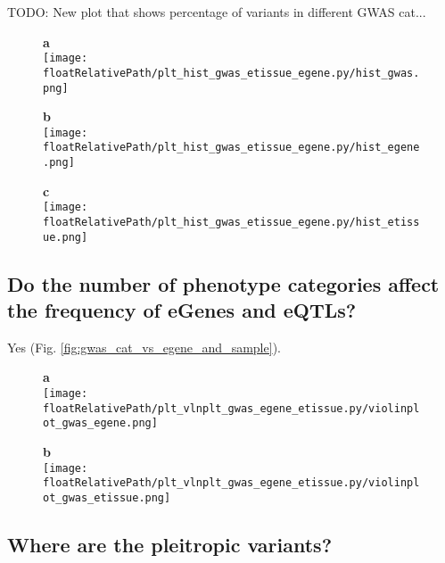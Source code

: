 TODO: New plot that shows percentage of variants in different GWAS cat...

\begin{figure*}[]
\centering
%
\begin{subfigure}[]{.32\textwidth}
\textbf{a}
\\
\texttt{[image: \\floatRelativePath/plt\_hist\_gwas\_etissue\_egene.py/hist\_gwas.png]}
\end{subfigure}
%
\begin{subfigure}[]{.32\textwidth}
\textbf{b}
\\
\texttt{[image: \\floatRelativePath/plt\_hist\_gwas\_etissue\_egene.py/hist\_egene.png]}
\end{subfigure}
%
\begin{subfigure}[]{.32\textwidth}
\textbf{c}
\\
\texttt{[image: \\floatRelativePath/plt\_hist\_gwas\_etissue\_egene.py/hist\_etissue.png]}
\end{subfigure}
%
\caption{\textbf{Probability density of GWAS phenotypes, eGene or eQTL samples.} (\textbf{a}) TODO.} \label{fig:nucleus}
\end{figure*}

\subsection*{Do the number of phenotype categories affect the frequency of eGenes and eQTLs?}

Yes (Fig. \ref{fig:gwas_cat_vs_egene_and_sample}).

\begin{figure*}[!]
\centering
%
\begin{subfigure}[]{.33\textwidth}
\textbf{a}
\\
\texttt{[image: \\floatRelativePath/plt\_vlnplt\_gwas\_egene\_etissue.py/violinplot\_gwas\_egene.png]}
\end{subfigure}
%
\begin{subfigure}[]{.33\textwidth}
\textbf{b}
\\
\texttt{[image: \\floatRelativePath/plt\_vlnplt\_gwas\_egene\_etissue.py/violinplot\_gwas\_etissue.png]}
\end{subfigure}
%
\caption{\textbf{Relation between GWAS category number and eGene and eQTL sample number.} (\textbf{a}) TODO.} \label{fig:gwas_cat_vs_egene_and_sample}
%
\end{figure*}

\subsection*{Where are the pleitropic variants?}

